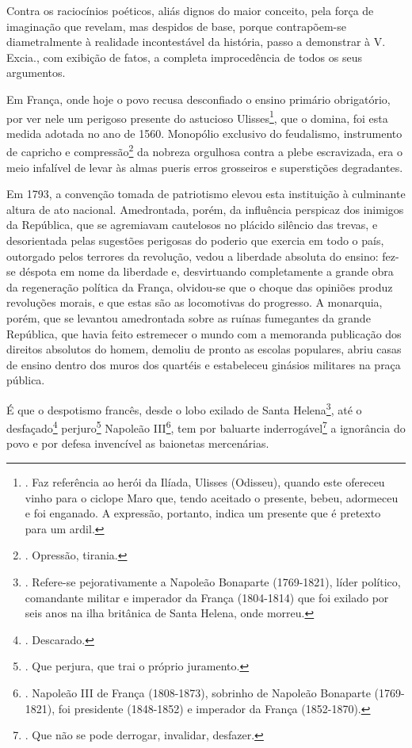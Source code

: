 Contra os raciocínios poéticos, aliás dignos do maior conceito, pela
força de imaginação que revelam, mas despidos de base, porque
contrapõem-se diametralmente à realidade incontestável da história,
passo a demonstrar à V. Excia., com exibição de fatos, a completa
improcedência de todos os seus argumentos.

Em França, onde hoje o povo recusa desconfiado o ensino primário
obrigatório, por ver nele um perigoso presente do astucioso
Ulisses\footnote{. Faz referência ao herói da Ilíada, Ulisses (Odisseu),
  quando este ofereceu vinho para o ciclope Maro que, tendo aceitado o
  presente, bebeu, adormeceu e foi enganado. A expressão, portanto,
  indica um presente que é pretexto para um ardil.}, que o domina, foi
esta medida adotada no ano de 1560. Monopólio exclusivo do feudalismo,
instrumento de capricho e compressão\footnote{. Opressão, tirania.} da
nobreza orgulhosa contra a plebe escravizada, era o meio infalível de
levar às almas pueris erros grosseiros e superstições degradantes.

Em 1793, a convenção tomada de patriotismo elevou esta instituição à
culminante altura de ato nacional. Amedrontada, porém, da influência
perspicaz dos inimigos da República, que se agremiavam cautelosos no
plácido silêncio das trevas, e desorientada pelas sugestões perigosas do
poderio que exercia em todo o país, outorgado pelos terrores da
revolução, vedou a liberdade absoluta do ensino: fez-se déspota em nome
da liberdade e, desvirtuando completamente a grande obra da regeneração
política da França, olvidou-se que o choque das opiniões produz
revoluções morais, e que estas são as locomotivas do progresso. A
monarquia, porém, que se levantou amedrontada sobre as ruínas fumegantes
da grande República, que havia feito estremecer o mundo com a memoranda
publicação dos direitos absolutos do homem, demoliu de pronto as escolas
populares, abriu casas de ensino dentro dos muros dos quartéis e
estabeleceu ginásios militares na praça pública.

É que o despotismo francês, desde o lobo exilado de Santa
Helena\footnote{. Refere-se pejorativamente a Napoleão Bonaparte
  (1769-1821), líder político, comandante militar e imperador da França
  (1804-1814) que foi exilado por seis anos na ilha britânica de Santa
  Helena, onde morreu.}, até o desfaçado\footnote{. Descarado.}
perjuro\footnote{. Que perjura, que trai o próprio juramento.} Napoleão
III\footnote{. Napoleão III de França (1808-1873), sobrinho de Napoleão
  Bonaparte (1769-1821), foi presidente (1848-1852) e imperador da
  França (1852-1870).}, tem por baluarte inderrogável\footnote{. Que não
  se pode derrogar, invalidar, desfazer.} a ignorância do povo e por
defesa invencível as baionetas mercenárias.

